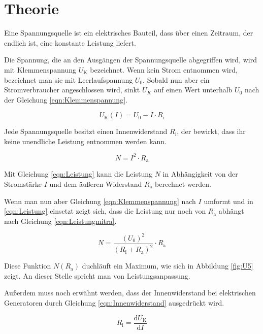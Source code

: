 \section{Theorie}
\label{sec:Theorie}

Eine Spannungsquelle ist ein elektrisches Bauteil, dass über einen Zeitraum, der endlich ist,
eine konstante Leistung liefert.

Die Spannung, die an den Ausgängen der Spannungsquelle abgegriffen wird, wird
mit Klemmenspannung $U_\text{K}$ bezeichnet. Wenn kein Strom entnommen wird, bezeichnet
man sie mit Leerlaufspannung $U_\text{0}$. Sobald nun aber ein Stromverbraucher
angeschlossen wird, sinkt $U_K$ auf einen Wert unterhalb $U_\text{0}$ nach der Gleichung
\eqref{eqn:Klemmenspannung}.

\begin{equation}
  U_\text{K}(I) = U_\text{0} - I \cdot R_\text{i}
  \label{eqn:Klemmenspannung}
\end{equation}

Jede Spannungsquelle besitzt einen Innenwiderstand $R_\text{i}$, der bewirkt, dass
ihr keine unendliche Leistung entnommen werden kann.

\begin{equation}
  N = I^2 \cdot R_\text{a}
  \label{eqn:Leistung}
\end{equation}

Mit Gleichung \eqref{eqn:Leistung} kann die Leistung $N$ in Abhängigkeit von der Stromstärke $I$
und dem äußeren Widerstand $R_\text{a}$ berechnet werden.

Wenn man nun aber Gleichung
\eqref{eqn:Klemmenspannung} nach $I$ umformt und in \eqref{eqn:Leistung} einsetzt
zeigt sich, dass die Leistung nur noch von $R_\text{a}$ abhängt nach Gleichung
\eqref{eqn:Leistungmitra}.

\begin{equation}
  N = \frac{(U_\text{0})^2}{(R_\text{i} + R_\text{a})^2} \cdot R_\text{a}
  \label{eqn:Leistungmitra}
\end{equation}

Diese Funktion $N(R_\text{a})$ duchläuft ein Maximum, wie sich in Abbildung
\ref{fig:U5} zeigt. An dieser Stelle spricht man von Leistungsanpassung.

Außerdem muss noch erwähnt werden, dass der Innenwiderstand bei elektrischen
Generatoren durch Gleichung \eqref{eqn:Innenwiderstand} ausgedrückt wird.

\begin{equation}
  R_\text{i} = \frac{\text{d}U_\text{K}}{\text{d}I}
  \label{eqn:Innenwiderstand}
\end{equation}

\newpage

